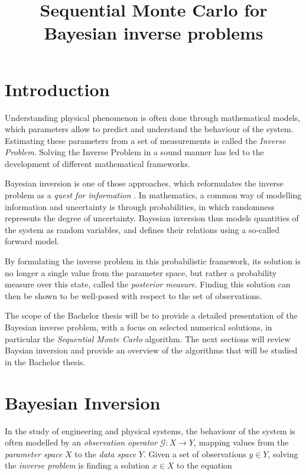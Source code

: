 \documentclass{article}
\begin{document}
\date{}
\title{Sequential Monte Carlo for Bayesian inverse problems}

\maketitle

\section{Introduction}

Understanding physical phenomenon is often done through mathematical models, which parameters allow to predict and understand the behaviour of the system. Estimating these parameters from a set of measurements is called the \textit{Inverse Problem}. Solving the Inverse Problem in a sound manner has led to the development of different mathematical frameworks.

Bayesian inversion is one of those approaches, which reformulates the inverse problem as a \textit{quest for information} \cite{kaipio2006statistical}. In mathematics, a common way of modelling information and uncertainty is through probabilities, in which randomness represents the degree of uncertainty. Bayesian inversion thus models quantities of the system as random variables, and defines their relations using a so-called forward model.

By formulating the inverse problem in this probabilistic framework, its solution is no longer a single value from the parameter space, but rather a probability measure over this state, called the \textit{posterior measure}. Finding this solution can then be shown to be well-posed with respect to the set of observations.

The scope of the Bachelor thesis will be to provide a detailed presentation of the Bayesian inverse problem, with a focus on selected numerical solutions, in particular the \textit{Sequential Monte Carlo} algorithm. The next sections will review Baysian inversion and provide an overview of the algorithms that will be studied in the Bachelor thesis. 

\section{Bayesian Inversion}

In the study of engineering and physical systems, the behaviour of the system is often modelled by an \textit{observation operator} $\mathcal{G} : X \rightarrow Y$, mapping values from the \textit{parameter space} $X$ to the \textit{data space} $Y$. Given a set of observations $y \in Y$, solving the \textit{inverse problem} is finding a solution $x \in X$ to the equation
\end{document}
